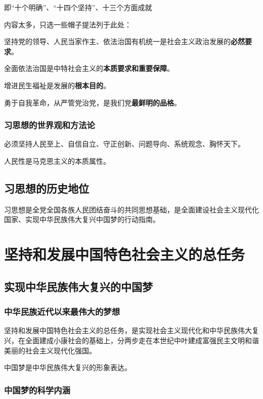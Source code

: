 \documentclass[12pt, a4paper, oneside]{ctexart}
\begin{document}
即“十个明确”、“十四个坚持”、十三个方面成就

内容太多，只选一些帽子提法列于此处：

坚持党的领导、人民当家作主、依法治国有机统一是社会主义政治发展的\textbf{必然要求}。

全面依法治国是中特社会主义的\textbf{本质要求和重要保障}。

增进民生福祉是发展的\textbf{根本目的}。

勇于自我革命，从严管党治党，是我们党\textbf{最鲜明的品格}。

\subsubsection{习思想的世界观和方法论}

必须坚持人民至上、自信自立、守正创新、问题导向、系统观念、胸怀天下。

人民性是马克思主义的本质属性。

\subsection{习思想的历史地位}

习思想是全党全国各族人民团结奋斗的共同思想基础，是全面建设社会主义现代化国家、实现中华民族伟大复兴中国梦的行动指南。

\section{坚持和发展中国特色社会主义的总任务}

\subsection{实现中华民族伟大复兴的中国梦}

\subsubsection{中华民族近代以来最伟大的梦想}

坚持和发展中国特色社会主义的总任务，是实现社会主义现代化和中华民族伟大复兴，在全面建成小康社会的基础上，分两步走在本世纪中叶建成富强民主文明和谐美丽的社会主义现代化强国。

中国梦是中华民族伟大复兴的形象表达。

\subsubsection{中国梦的科学内涵}
\end{document}
